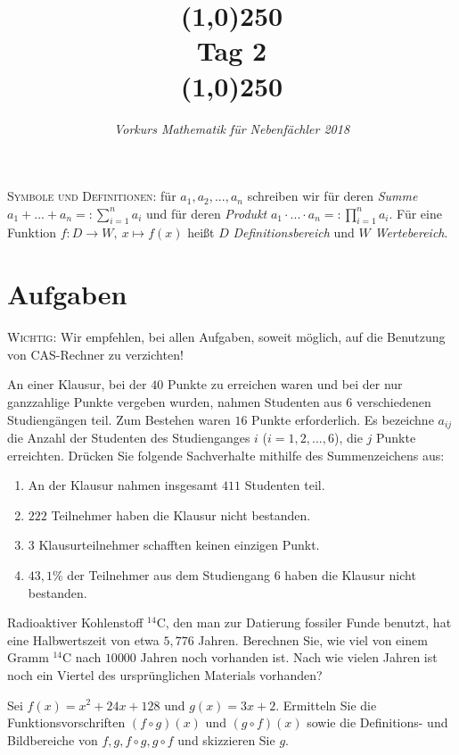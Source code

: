 \documentclass[11pt]{article}
\begin{document}
\title{\line(1,0){250}\\Tag 2\\\line(1,0){250}}
\date{}
\author{\itshape Vorkurs Mathematik für Nebenfächler 2018}
\maketitle
\begin{framed}
	\noindent \scriptsize
	\textsc{Symbole und Definitionen:} für $a_1,a_2,...,a_n$ schreiben wir für deren \emph{Summe} $a_1+...+a_n=:\sum_{i=1}^n a_i$ und für deren \emph{Produkt} $a_1\cdot...\cdot a_n =: \prod_{i=1}^n a_i$. Für eine Funktion $f:D\to W,~x\mapsto f(x)$ heißt $D$ \emph{Definitionsbereich} und $W$ \emph{Wertebereich}.
\end{framed}
\section*{Aufgaben}
\textsc{Wichtig:} Wir empfehlen, bei allen Aufgaben, soweit möglich, auf die Benutzung von CAS-Rechner zu verzichten!
\begin{task}
An einer Klausur, bei der $40$ Punkte zu erreichen waren und bei der nur ganzzahlige Punkte
vergeben wurden, nahmen Studenten aus $6$ verschiedenen Studieng\"angen teil. Zum Bestehen
waren $16$ Punkte erforderlich. Es bezeichne $a_{ij}$ die Anzahl der Studenten des Studienganges
$i$ ($i = 1, 2, . . ., 6$), die $j$ Punkte erreichten. Dr\"ucken Sie folgende Sachverhalte mithilfe des
Summenzeichens aus:
\begin{enumerate}
	\item An der Klausur nahmen insgesamt $411$ Studenten teil.
	\item $222$ Teilnehmer haben die Klausur nicht bestanden.
	\item $3$ Klausurteilnehmer schafften keinen einzigen Punkt.
	\item $43,1 \%$ der Teilnehmer aus dem Studiengang $6$ haben die Klausur nicht bestanden.
\end{enumerate}
\end{task}
\begin{task}
	Radioaktiver Kohlenstoff $^{14}$C, den man zur Datierung fossiler Funde
	benutzt, hat eine Halbwertszeit von etwa $5,776$ Jahren. Berechnen Sie, wie viel
	von einem Gramm $^{14}$C nach $10 000$ Jahren noch vorhanden ist. Nach wie vielen Jahren ist noch ein Viertel des ursprünglichen Materials vorhanden?
\end{task}
\begin{task}
Sei $f(x)=x^2+24x+128$ und $g(x)=3x+2$. Ermitteln Sie die Funktionsvorschriften $(f \circ g)(x)$ und $(g \circ f)(x)$ sowie die Definitions- und Bildbereiche von $f, g, f \circ g, g \circ f$ und skizzieren Sie $g$.
\end{task}
\end{document}
